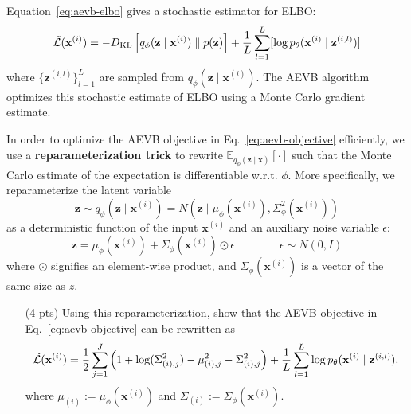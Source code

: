 Equation~\eqref{eq:aevb-elbo} gives a stochastic estimator for ELBO:
\begin{equation}
\tilde{\mathcal{L}}(\mathbf{x}^{(i)})
= - D_{\textrm{KL}}\left[ q_\phi(\mathbf{z} \mid \mathbf{x}^{(i)})  \;\|\; p(\mathbf{z})\right] + \frac{1}{L} \sum_{l=1}^L [\log p_\theta(\mathbf{x}^{(i)} \mid \mathbf{z}^{(i, l)}) ]
\label{eq:aevb-objective}
\end{equation}
where $\{ \mathbf{z}^{(i,l)} \}_{l=1}^L$ are sampled from $q_\phi(\mathbf{z} \mid \mathbf{x}^{(i)})$. The AEVB algorithm optimizes this stochastic estimate of ELBO using a Monte Carlo gradient estimate.

In order to optimize the AEVB objective in Eq.~\eqref{eq:aevb-objective} efficiently, we use a \textbf{reparameterization trick} to rewrite  $\mathbb{E}_{q_\phi(\mathbf{z} \mid \mathbf{x})}[\cdot]$ such that the Monte Carlo estimate of the expectation is differentiable w.r.t. $\phi$. More specifically, we reparameterize the latent variable
\[
\mathbf{z} \sim q_\phi(\mathbf{z} \mid \mathbf{x}^{(i)}) = N(\mathbf{z} \mid \mu_\phi(\mathbf{x}^{(i)}),  \Sigma_\phi^2(\mathbf{x}^{(i)}) )\]
as a deterministic function of the input $\mathbf{x}^{(i)}$ and an auxiliary noise variable $\epsilon$:
\begin{equation}\label{eq:vae:latent-map}
\mathbf{z} = \mu_\phi(\mathbf{x}^{(i)}) + \Sigma_\phi(\mathbf{x}^{(i)}) \odot \epsilon
\qquad\qquad \epsilon \sim N(0, I)
\end{equation}
where $\odot$ signifies an element-wise product, and $\Sigma_\phi(\mathbf{x}^{(i)})$ is a vector of the same size as $z$.

\begin{itemize}
    \item[(4 pts)]  Using this reparameterization, show that the AEVB objective in Eq.~\eqref{eq:aevb-objective} can be rewritten as
    \begin{equation}
\tilde{\mathcal{L}}(\mathbf{x}^{(i)})
= {1 \over 2} \sum_{j=1}^J \left( 1 + \log( \Sigma_{(i),j}^2 ) - \mu_{(i),j}^2 - \Sigma_{(i),j}^2 \right) + {1 \over L} \sum_{l=1}^L \log p_\theta(\mathbf{x}^{(i)} \mid \mathbf{z}^{(i, l)}).
\label{eq:aevb-objective2}
    \end{equation}
where $\mu_{(i)} := \mu_\phi(\mathbf{x}^{(i)})$ and $\Sigma_{(i)} := \Sigma_\phi(\mathbf{x}^{(i)})$. 

\begin{solution}
\end{solution}

\end{itemize}

